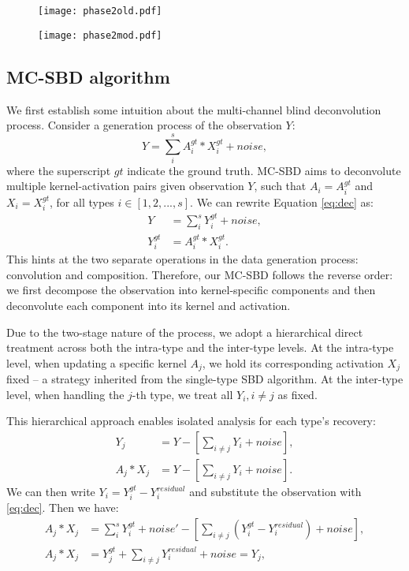 \begin{figure}
	\texttt{[image: phase2old.pdf]}
	\centering
	\caption{}
	\label{fig:ch6_phase2}
\end{figure}


\begin{figure}
	\texttt{[image: phase2mod.pdf]}
	\centering
	\caption{}
	\label{fig:ch6_phase2mod}
\end{figure}


\subsection{MC-SBD algorithm}
We first establish some intuition about the multi-channel blind deconvolution process. Consider a generation process of the observation $Y$: 
\begin{equation}
	\label{eq:dec}
	Y = \sum_{i}^{s} A_i^{gt} * X_i^{gt} + noise, 
\end{equation}
\noindent where the superscript $gt$ indicate the ground truth. \ac{MC-SBD} aims to deconvolute multiple kernel-activation pairs given observation $Y$, such that $A_i=A_i^{gt}$ and $X_i = X_i^{gt}$, for all types $i \in [1,2,...,s]$. We can rewrite Equation \ref{eq:dec} as: 
\begin{align}
	Y &= \sum_{i}^{s} Y_i^{gt} + noise,\\ 
	Y_i^{gt} &= A_i^{gt} * X_i^{gt}.
\end{align}
\noindent This hints at the two separate operations in the data generation process: convolution and composition. Therefore, our \ac{MC-SBD} follows the reverse order: we first decompose the observation into kernel-specific components and then deconvolute each component into its kernel and activation. 

Due to the two-stage nature of the process, we adopt a hierarchical direct treatment across both the intra-type and the inter-type levels. At the intra-type level, when updating a specific kernel $A_j$, we hold its corresponding activation $X_j$ fixed -- a strategy inherited from the single-type \ac{SBD} algorithm. At the inter-type level, when handling the $j$-th type, we treat all $Y_i, i\neq j$ as fixed. 

This hierarchical approach enables isolated analysis for each type’s recovery:
\begin{align}
	Y_j &= Y - [\sum_{i\neq j}Y_i + noise],\\
	A_j * X_j &= Y - [\sum_{i\neq j}Y_i + noise].
\end{align} 
\noindent We can then write $Y_i = Y_i^{gt}- Y_i^{residual}$ and substitute the observation with \ref{eq:dec}. Then we have:
\begin{align}
	A_j * X_j &= \sum_{i}^{s} Y_i^{gt} + noise' - [\sum_{i\neq j}(Y_i^{gt}- Y_i^{residual}) + noise],\\ \label{eq:622}
	A_j * X_j &= Y_j^{gt}+ \sum_{i\neq j}Y_i^{residual} + noise = Y_j,
\end{align} 

